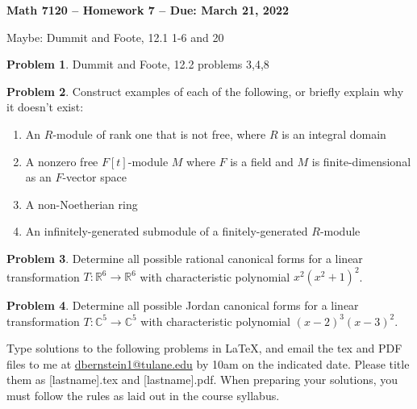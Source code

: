\documentclass[letterpaper,11pt]{amsart}
\theoremstyle{plain}
\theoremstyle{definition}
\newtheorem{pr}{Problem}
\theoremstyle{remark}
\begin{document}
\Large

\begin{center}
{\bf Math 7120 -- Homework  7 --  Due:  March 21, 2022}
\end{center}

\normalsize

\medskip

Maybe: Dummit and Foote, 12.1 1-6 and 20


\begin{pr}
    Dummit and Foote, 12.2 problems 3,4,8
\end{pr}





\begin{pr}
    Construct examples of each of the following, or briefly explain why it doesn't exist:
    \begin{enumerate}
        \item An $R$-module of rank one that is not free, where $R$ is an integral domain
        \item A nonzero free $F[t]$-module $M$ where $F$ is a field and $M$ is finite-dimensional as an $F$-vector space
        \item A non-Noetherian ring
        \item An infinitely-generated submodule of a finitely-generated $R$-module
    \end{enumerate}
\end{pr}


\begin{pr}
    Determine all possible rational canonical forms for a linear transformation $T: \mathbb{R}^6\rightarrow \mathbb{R}^6$ with characteristic polynomial $x^2(x^2+1)^2$.
\end{pr}

\begin{pr}
    Determine all possible Jordan canonical forms for a linear transformation $T: \mathbb{C}^5\rightarrow \mathbb{C}^5$ with characteristic polynomial $(x-2)^3(x-3)^2$.
\end{pr}






\bigskip

Type solutions to the following problems in \LaTeX, and email the tex and PDF files to me at \url{dbernstein1@tulane.edu} by 10am on the indicated date.
Please title them as [lastname].tex and [lastname].pdf.
When preparing your solutions, you must follow the rules as laid out in the course syllabus.
\end{document}
